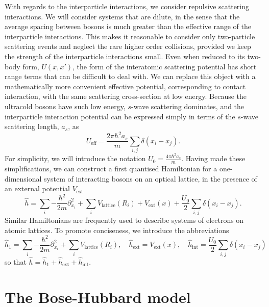 \documentclass[prb, twocolumn, final]{revtex4-1}
\theoremstyle{plain}
\begin{document}
With regards to the interparticle interactions, we consider repulsive scattering
interactions. We will consider systems that are dilute, in the sense that the
average spacing between bosons is much greater than the effective range of the
interparticle interactions. This makes it reasonable to consider only
two-particle scattering events and neglect the rare higher order collisions,
provided we keep the strength of the interparticle interactions small. Even when
reduced to its two-body form, $U(x,x')$, the form of the interatomic scattering
potential has short range terms that can be difficult to deal with. We can
replace this object with a mathematically more convenient effective potential,
corresponding to contact interaction, with the same scattering cross-section at
low energy. Because the ultracold bosons have such low energy, $s$-wave
scattering dominates, and the interparticle interaction potential can be
expressed simply in terms of the $s$-wave scattering length, $a_{s}$, as
\begin{equation}
    U_{\text{eff}}
    =
    \frac{2 \pi\hbar^{2} a_{s}}{m}
    \sum_{i,j}{\delta(x_{i} - x_{j})}.
\end{equation}
For simplicity, we will introduce the notation $U_{0} = \frac{4 \pi \hbar^{2}
a_{s}}{m}$. Having made these simplifications, we can construct a first
quantised Hamiltonian for a one-dimensional system of interacting bosons on an
optical lattice, in the presence of an external potential $V_{\text{ext}}$
\begin{equation}
    \label{eq:HamiltonianCoordinateRepresentation}
    \hat{h}
    =
    \sum_{i}{-\frac{\hbar^{2}}{2m}  \partial_{x_{i}}^{2}} +
    \sum_{i}{V_{\text{lattice}}(R_{i})} +
    V_{\text{ext}}(x) +
    \frac{U_{0}}{2} \sum_{i,j}{\delta(x_{i} - x_{j})}.
\end{equation}
Similar Hamiltonians are frequently used to describe systems of electrons on
atomic lattices. To promote conciseness, we introduce the abbreviations
\begin{equation*}
    \hat{h}_{1}
    =
    \sum_{i}{-\frac{\hbar^{2}}{2m} \partial_{x_{i}}^{2}} +
    \sum_{i}{V_{\text{lattice}}(R_{i})},
    \quad
    \hat{h}_{\text{ext}}
    =
    V_{\text{ext}}(x),
    \quad
    \hat{h}_{\text{int}}
    =
    \frac{U_{0}}{2} \sum_{i,j}\delta{(x_{i}-x_{j})}
\end{equation*}
so that $\hat{h}=\hat{h}_1+\hat{h}_{\text{ext}}+\hat{h}_{\text{int}}$.


\section{The Bose-Hubbard model}
\end{document}
